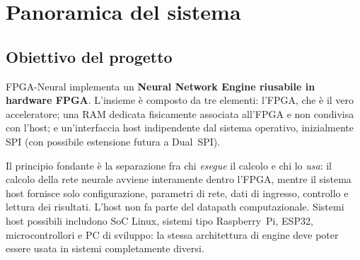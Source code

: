 \chapter{Panoramica del sistema}
\label{ch:overview}

\section{Obiettivo del progetto}
FPGA-Neural implementa un \textbf{Neural Network Engine riusabile in hardware FPGA}.
L'insieme è composto da tre elementi: l'FPGA, che è il vero acceleratore; una RAM
dedicata fisicamente associata all'FPGA e non condivisa con l'host; e un'interfaccia
host indipendente dal sistema operativo, inizialmente SPI (con possibile estensione
futura a Dual~SPI).

Il principio fondante è la separazione fra chi \emph{esegue} il calcolo e chi lo
\emph{usa}: il calcolo della rete neurale avviene interamente dentro l'FPGA, mentre
il sistema host fornisce solo configurazione, parametri di rete, dati di ingresso,
controllo e lettura dei risultati. L'host non fa parte del datapath computazionale.
Sistemi host possibili includono SoC Linux, sistemi tipo Raspberry~Pi, ESP32,
microcontrollori e PC di sviluppo: la stessa architettura di engine deve poter essere
usata in sistemi completamente diversi.

\begin{center}
\end{center}

